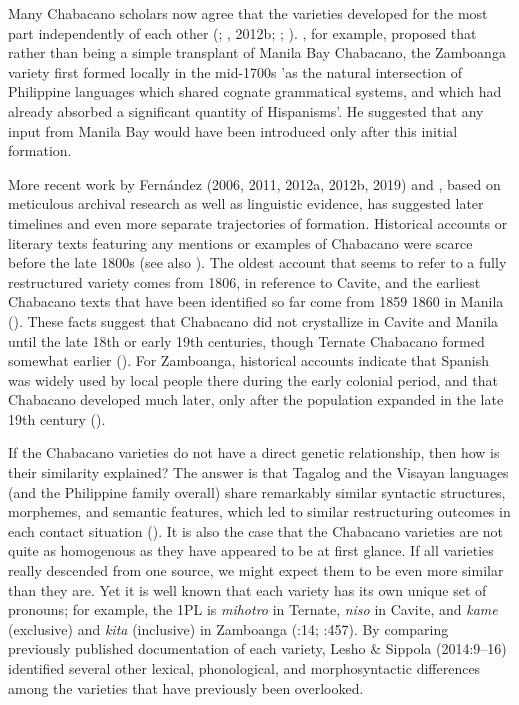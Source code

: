 \documentclass[output=paper]{langsci/langscibook}
\begin{document}
Many Chabacano scholars now agree that the varieties developed for the most part independently of each other (\citealt{Lipski1992}; \citealt{Fernández2011,2012a2011}, 2012b; \citealt{FernándezSippola2017}; \citealt{SippolaLesho2020}). \citet[12]{Lipski1992}, for example, proposed that rather than being a simple transplant of Manila Bay Chabacano, the Zamboanga variety first formed locally in the mid-1700s 'as the natural intersection of Philippine languages which shared cognate grammatical systems, and which had already absorbed a significant quantity of Hispanisms'. He suggested that any input from Manila Bay would have been introduced only after this initial formation.

More recent work by Fernández (2006, 2011,  2012a, 2012b, 2019) and \citet{FernándezSippola2017}, based on meticulous archival research as well as linguistic evidence, has suggested later timelines and even more separate trajectories of formation. Historical accounts or literary texts featuring any mentions or examples of Chabacano were scarce before the late 1800s (see also \citealt{Lipski2013}). The oldest account that seems to refer to a fully restructured variety comes from 1806, in reference to Cavite, and the earliest Chabacano texts that have been identified so far come from 1859 1860 in Manila (\citealt{FernándezSippola2017}). These facts suggest that Chabacano did not crystallize in Cavite and Manila until the late 18th or early 19th centuries, though Ternate Chabacano formed somewhat earlier (\citealt{FernándezSippola2017}). For Zamboanga, historical accounts indicate that Spanish was widely used by local people there during the early colonial period, and that Chabacano developed much later, only after the population expanded in the late 19th century (\citealt{Fernández2006,2012b2006}). 

If the Chabacano varieties do not have a direct genetic relationship, then how is their similarity explained? The answer is that Tagalog and the Visayan languages (and the Philippine family overall) share remarkably similar syntactic structures, morphemes, and semantic features, which led to similar restructuring outcomes in each contact situation (\citealt{SippolaLesho2020}). It is also the case that the Chabacano varieties are not quite as homogenous as they have appeared to be at first glance. If all varieties really descended from one source, we might expect them to be even more similar than they are. Yet it is well known that each variety has its own unique set of pronouns; for example, the 1PL is \textit{mihotro} in Ternate, \textit{niso} in Cavite, and \textit{kame} (exclusive) and \textit{kita} (inclusive) in Zamboanga (\citealt{LeshoSippola2014}:14; \citealt{Lipski2013}:457). By comparing previously published documentation of each variety, Lesho \& Sippola (2014:9–16) identified several other lexical, phonological, and morphosyntactic differences among the varieties that have previously been overlooked. 
\end{document}
